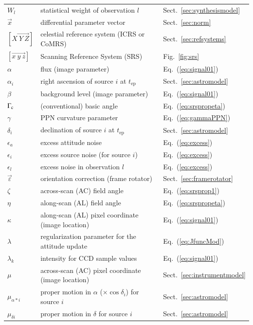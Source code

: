 \documentclass[structabstract]{aa}
\begin{document}
\begin{longtable}{lll}
$W_l$ & statistical weight of observation $l$ & Sect.~\ref{sec:synthesismodel}\\
$\vec{x}$ & differential parameter vector& Sect.~\ref{sec:norm}\\
$[\vec{X~Y~Z}]$ & celestial reference system (ICRS or CoMRS) & Sect.~\ref{sec:refsystems} \\
$[\vec{x~y~z}]$ & Scanning Reference System (SRS) & Fig.~\ref{fig:srs} \\
$\alpha$ &  flux (image parameter)  &Eq.~(\ref{eq:signal01})\\
$\alpha_i$ & right ascension of source $i$ at $t_\text{ep}$  &Sect.~\ref{sec:astromodel} \\
$\beta$ &  background level (image parameter)  &Eq.~(\ref{eq:signal01})\\
$\Gamma_{\rm c}$ &  (conventional) basic angle  & Eq.~(\ref{eq:srspropeta})\\
$\gamma$ &  PPN curvature parameter  & Eq.~(\ref{eq:gammaPPN})\\
$\delta_i$ &  declination of source $i$ at $t_\text{ep}$ &Sect.~\ref{sec:astromodel} \\
$\epsilon_a$ &  excess attitude noise & Eq.~(\ref{eq:excess}) \\
$\epsilon_i$ &  excess source noise (for source $i$) & Eq.~(\ref{eq:excess}) \\
$\epsilon_l$ &  excess noise in observation $l$ & Eq.~(\ref{eq:excess}) \\
$\vec{\varepsilon}$ & orientation correction (frame rotator) &Sect.~\ref{sec:framerotator} \\
$\zeta$ & across-scan (AC) field angle & Eq.~(\ref{eq:srsprop1}) \\
$\eta$ & along-scan (AL) field angle & Eq.~(\ref{eq:srspropeta}) \\
$\kappa$ &  along-scan (AL) pixel coordinate (image location)  &Eq.~(\ref{eq:signal01})\\
$\lambda$ & regularization parameter for the attitude update &Eq.~(\ref{eq:JfuncMod})\\
$\lambda_k$ & intensity for CCD sample values  & Eq.~(\ref{eq:signal01})\\
$\mu$ & across-scan (AC) pixel coordinate (image location) & Sect.~\ref{sec:instrumentmodel}\\
$\mu_{\alpha* i}$ & proper motion in $\alpha$ ($\times\cos\delta_i$)
for source $i$ &Sect.~\ref{sec:astromodel} \\
$\mu_{\delta i}$ & proper motion in $\delta$ for source $i$ & Sect.~\ref{sec:astromodel} \\

\end{longtable}
\end{document}
